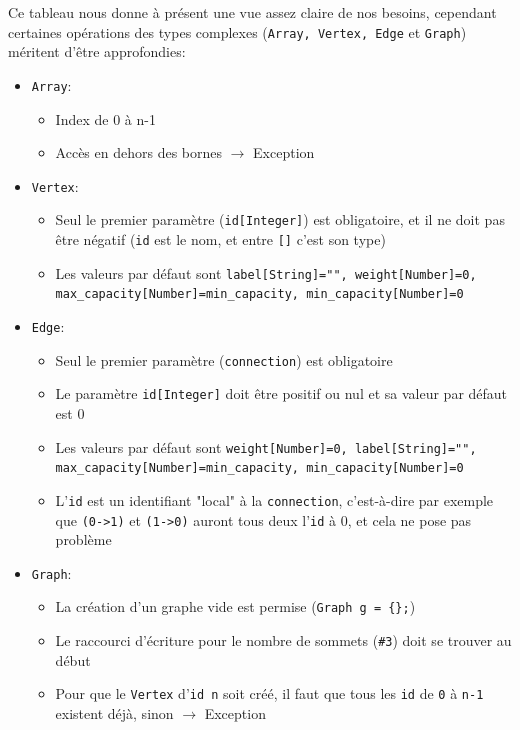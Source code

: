 \documentclass[french]{article}
\begin{document}
				Ce tableau nous donne à présent une vue assez claire de nos besoins, cependant certaines opérations des types complexes (\texttt{Array, Vertex, Edge} et \texttt{Graph}) méritent d'être approfondies:
				
				\begin{itemize}
					\item \texttt{Array}: 
					\begin{itemize}
						\item Index de 0 à n-1
						\item Accès en dehors des bornes $\rightarrow$ Exception
					\end{itemize}
					\item \texttt{Vertex}:
					\begin{itemize}
						\item Seul le premier paramètre (\texttt{id[Integer]}) est obligatoire, et il ne doit pas être négatif (\texttt{id} est le nom, et entre \texttt{[]} c'est son type)
						\item Les valeurs par défaut sont \texttt{label[String]="", weight[Number]=0, max\_capacity[Number]=min\_capacity, min\_capacity[Number]=0}
					\end{itemize}
					\item \texttt{Edge}: 
					\begin{itemize}
						\item Seul le premier paramètre (\texttt{connection}) est obligatoire
						\item Le paramètre \texttt{id[Integer]} doit être positif ou nul et sa valeur par défaut est 0
						\item Les valeurs par défaut sont \texttt{weight[Number]=0, label[String]="", max\_capacity[Number]=min\_capacity, min\_capacity[Number]=0}
						\item L'\texttt{id} est un identifiant "local" à la \texttt{connection}, c'est-à-dire par exemple que \texttt{(0->1)} et \texttt{(1->0)} auront tous deux l'\texttt{id} à 0, et cela ne pose pas problème
					\end{itemize}
					\item \texttt{Graph}: 
					\begin{itemize}
						\item La création d'un graphe vide est permise (\texttt{Graph g = \{\};})
						\item Le raccourci d'écriture pour le nombre de sommets (\texttt{\#3}) doit se trouver au début
						\item Pour que le \texttt{Vertex} d'\texttt{id n} soit créé, il faut que tous les \texttt{id} de \texttt{0} à \texttt{n-1} existent déjà, sinon $\rightarrow$ Exception 

\end{itemize}
\end{itemize}
\end{document}
